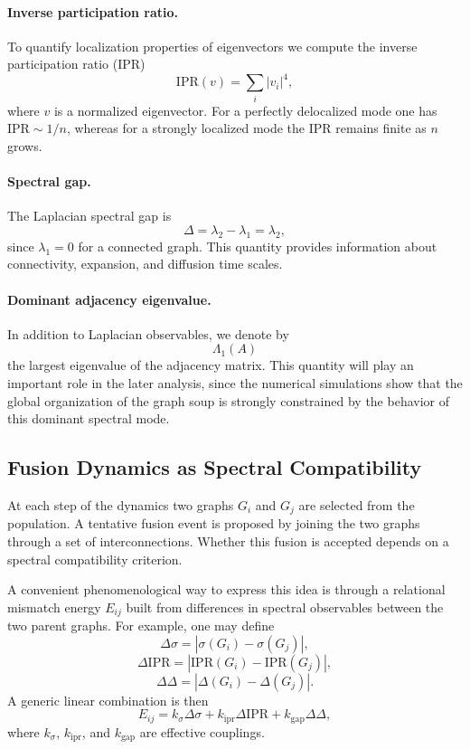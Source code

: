 \documentclass[11pt]{article}
\begin{document}
\paragraph{Inverse participation ratio.}
To quantify localization properties of eigenvectors we compute the inverse participation ratio (IPR)
\[
\mathrm{IPR}(v) = \sum_i |v_i|^4,
\]
where $v$ is a normalized eigenvector.
For a perfectly delocalized mode one has $\mathrm{IPR}\sim 1/n$, whereas for a strongly localized mode the IPR remains finite as $n$ grows.

\paragraph{Spectral gap.}
The Laplacian spectral gap is
\[
\Delta = \lambda_2-\lambda_1 = \lambda_2,
\]
since $\lambda_1=0$ for a connected graph.
This quantity provides information about connectivity, expansion, and diffusion time scales.

\paragraph{Dominant adjacency eigenvalue.}
In addition to Laplacian observables, we denote by
\[
\Lambda_1(A)
\]
the largest eigenvalue of the adjacency matrix.
This quantity will play an important role in the later analysis, since the numerical simulations show that the global organization of the graph soup is strongly constrained by the behavior of this dominant spectral mode.

\subsection{Fusion Dynamics as Spectral Compatibility}

At each step of the dynamics two graphs $G_i$ and $G_j$ are selected from the population.
A tentative fusion event is proposed by joining the two graphs through a set of interconnections.
Whether this fusion is accepted depends on a spectral compatibility criterion.

A convenient phenomenological way to express this idea is through a relational mismatch energy $E_{ij}$ built from differences in spectral observables between the two parent graphs. For example, one may define
\[
\Delta \sigma = |\sigma(G_i)-\sigma(G_j)|,
\]
\[
\Delta \mathrm{IPR} = |\mathrm{IPR}(G_i)-\mathrm{IPR}(G_j)|,
\]
\[
\Delta \Delta = |\Delta(G_i)-\Delta(G_j)|.
\]
A generic linear combination is then
\[
E_{ij} = k_\sigma \Delta\sigma + k_{\mathrm{ipr}} \Delta\mathrm{IPR} + k_{\mathrm{gap}} \Delta\Delta,
\]
where $k_\sigma$, $k_{\mathrm{ipr}}$, and $k_{\mathrm{gap}}$ are effective couplings.
\end{document}
